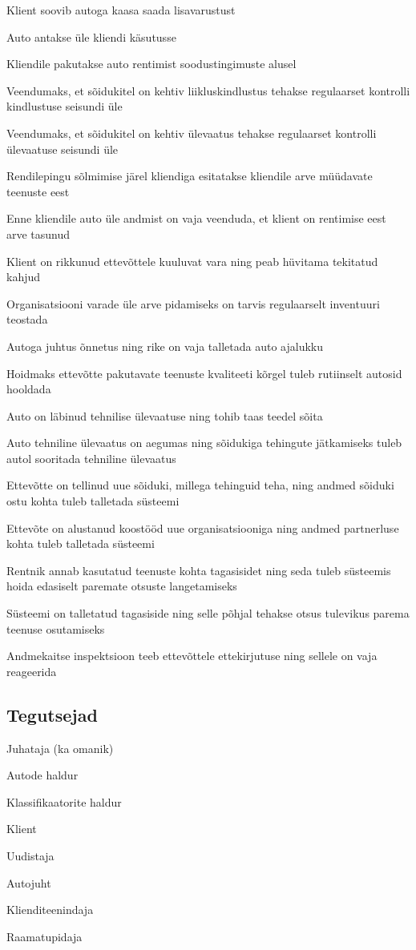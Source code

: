 \begin{myitemize}
	\item Klient soovib autoga kaasa saada lisavarustust
	\item Auto antakse üle kliendi käsutusse 
	\item Kliendile pakutakse auto rentimist soodustingimuste alusel
	\item Veendumaks, et sõidukitel on kehtiv liikluskindlustus tehakse regulaarset kontrolli kindlustuse seisundi üle
	\item Veendumaks, et sõidukitel on kehtiv ülevaatus tehakse regulaarset kontrolli ülevaatuse seisundi üle
	\item Rendilepingu sõlmimise järel kliendiga esitatakse kliendile arve müüdavate teenuste eest
	\item Enne kliendile auto üle andmist on vaja veenduda, et klient on rentimise eest arve tasunud
	\item Klient on rikkunud ettevõttele kuuluvat vara ning peab hüvitama tekitatud kahjud
	\item Organisatsiooni varade üle arve pidamiseks on tarvis regulaarselt inventuuri teostada
	\item Autoga juhtus õnnetus ning rike on vaja talletada auto ajalukku
	\item Hoidmaks ettevõtte pakutavate teenuste kvaliteeti kõrgel tuleb rutiinselt autosid hooldada
	\item Auto on läbinud tehnilise ülevaatuse ning tohib taas teedel sõita
	\item Auto tehniline ülevaatus on aegumas ning sõidukiga tehingute jätkamiseks tuleb autol sooritada tehniline ülevaatus
	\item Ettevõtte on tellinud uue sõiduki, millega tehinguid teha, ning andmed sõiduki ostu kohta tuleb talletada süsteemi
	\item Ettevõte on alustanud koostööd uue organisatsiooniga ning andmed partnerluse kohta tuleb talletada süsteemi
	\item Rentnik annab kasutatud teenuste kohta tagasisidet ning seda tuleb süsteemis hoida edasiselt paremate otsuste langetamiseks
	\item Süsteemi on talletatud tagasiside ning selle põhjal tehakse otsus tulevikus parema teenuse osutamiseks
	\item Andmekaitse inspektsioon teeb ettevõttele ettekirjutuse ning sellele on vaja reageerida
\end{myitemize}

\subsection{Tegutsejad}
\begin{myitemize}
	\item Juhataja (ka omanik)
	\item Autode haldur
	\item Klassifikaatorite haldur
	\item Klient
	\item Uudistaja
	\item Autojuht
	\item Klienditeenindaja
	\item Raamatupidaja
\end{myitemize}

